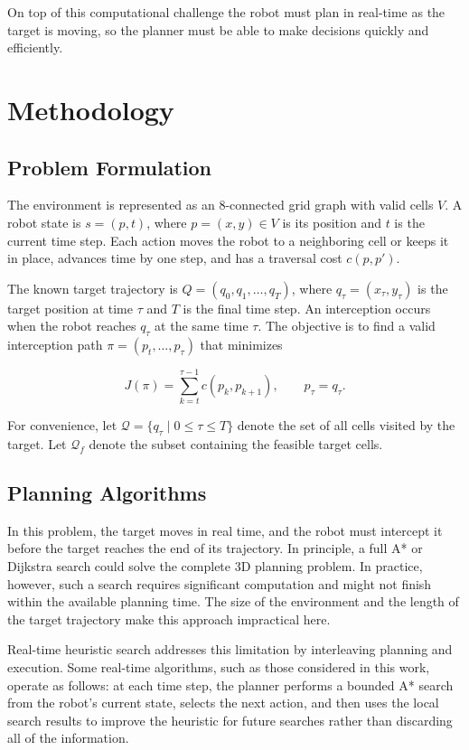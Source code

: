 \documentclass[11pt]{article}
\begin{document}
On top of this computational challenge the robot must plan in real-time as the target is moving, so the planner must be able to make decisions quickly and efficiently.

\section{Methodology}
\subsection{Problem Formulation}
The environment is represented as an 8-connected grid graph with valid cells \(V\). A robot state is \(s=(p,t)\), where \(p=(x,y)\in V\) is its position and \(t\) is the current time step. Each action moves the robot to a neighboring cell or keeps it in place, advances time by one step, and has a traversal cost \(c(p,p')\).

The known target trajectory is \(Q=(q_0,q_1,\ldots,q_T)\), where \(q_\tau=(x_\tau,y_\tau)\) is the target position at time \(\tau\) and \(T\) is the final time step. An interception occurs when the robot reaches \(q_\tau\) at the same time \(\tau\). The objective is to find a valid interception path \(\pi=(p_t,\ldots,p_\tau)\) that minimizes

\[
  J(\pi)=\sum_{k=t}^{\tau-1}c(p_k,p_{k+1}),
  \qquad p_\tau=q_\tau.
\]

For convenience, let \(\mathcal{Q}=\{q_\tau\mid 0\leq\tau\leq T\}\) denote
the set of all cells visited by the target. Let \(\mathcal{Q}_f\) denote the
subset containing the feasible target cells.

\subsection{Planning Algorithms}
In this problem, the target moves in real time, and the robot must intercept it before the target reaches the end of its trajectory. In principle, a full A* or Dijkstra search could solve the complete 3D planning problem. In practice, however, such a search requires significant computation and might not finish within the available planning time. The size of the environment and the length of the target trajectory make this approach impractical here.

Real-time heuristic search addresses this limitation by interleaving planning and execution. Some real-time algorithms, such as those considered in this work, operate as follows: at each time step, the planner performs a bounded A* search from the robot's current state, selects the next action, and then uses the local search results to improve the heuristic for future searches rather than discarding all of the information.
\end{document}
